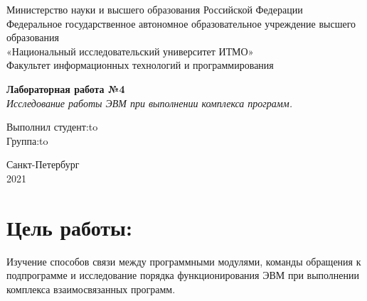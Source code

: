 \documentclass[a4paper,14pt]{article}
\begin{document}
\begin{titlepage}
\newpage

\begin{center}
Министерство науки и высшего образования Российской Федерации\\
Федеральное государственное автономное образовательное учреждение высшего образования\\
«Национальный исследовательский университет ИТМО»\\
Факультет информационных технологий и программирования\\
\end{center}

\vspace{\fill}

\begin{center}
\textbf{Лабораторная работа №4}\\
\textit{Исследование работы ЭВМ при выполнении комплекса программ.}
\end{center}

\vspace{\fill}

\newbox{\lbox}
\newlength{\maxl}
\setlength{\maxl}{\wd\lbox}
\hfill\parbox{14cm}{
\hspace*{5cm}Выполнил студент:\hfill\hbox to\\
\hspace*{5cm}Группа:\hfill\hbox to\\
}


\vspace{8em}

\begin{center}
Санкт-Петербург \\2021
\end{center}

\end{titlepage}


\section*{Цель работы:}
Изучение способов связи между программными модулями, команды обращения к подпрограмме и исследование порядка функционирования ЭВМ при выполнении комплекса взаимосвязанных программ.
\end{document}
